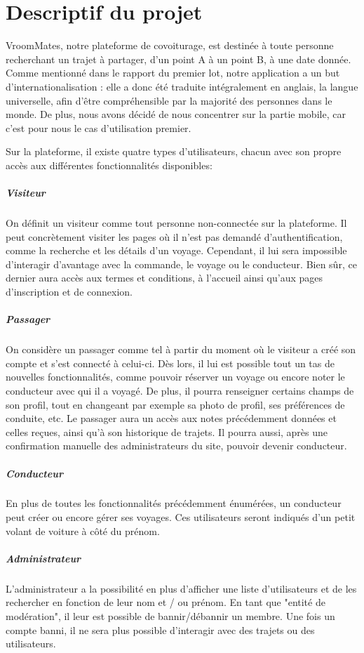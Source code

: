 \section{Descriptif du projet}

VroomMates, notre plateforme de covoiturage, est destinée à toute personne recherchant un trajet à partager, d'un point A à un point B, à une date donnée. Comme mentionné dans le rapport du premier lot, notre application a un but d'internationalisation : elle a donc été traduite intégralement en anglais, la langue universelle, afin d'être compréhensible par la majorité des personnes dans le monde. De plus, nous avons décidé de nous concentrer sur la partie mobile, car c'est pour nous le cas d'utilisation premier.

Sur la plateforme, il existe quatre types d'utilisateurs, chacun avec son propre accès aux différentes fonctionnalités disponibles:

\subparagraph{Visiteur}

On définit un visiteur comme tout personne non-connectée sur la plateforme. Il peut concrètement visiter les pages où il n'est pas demandé d'authentification, comme la recherche et les détails d'un voyage. Cependant, il lui sera impossible d'interagir d'avantage avec la commande, le voyage ou le conducteur.
Bien sûr, ce dernier aura accès aux termes et conditions, à l'accueil ainsi qu'aux pages d'inscription et de connexion.

\subparagraph{Passager}

On considère un passager comme tel à partir du moment où le visiteur a créé son compte et s'est connecté à celui-ci. Dès lors, il lui est possible tout un tas de nouvelles fonctionnalités, comme pouvoir réserver un voyage ou encore noter le conducteur avec qui il a voyagé. De plus, il pourra renseigner certains champs de son profil, tout en changeant par exemple sa photo de profil, ses préférences de conduite, etc. Le passager aura un accès aux notes précédemment données et celles reçues, ainsi qu'à son historique de trajets. Il pourra aussi, après une confirmation manuelle des administrateurs du site, pouvoir devenir conducteur. 

\subparagraph{Conducteur}

En plus de toutes les fonctionnalités précédemment énumérées, un conducteur peut créer ou encore gérer ses voyages. Ces utilisateurs seront indiqués d'un petit volant de voiture à côté du prénom.

\subparagraph{Administrateur}

L'administrateur a la possibilité en plus d'afficher une liste d'utilisateurs et de les rechercher en fonction de leur nom et / ou prénom. En tant que "entité de modération", il leur est possible de bannir/débannir un membre. Une fois un compte banni, il ne sera plus possible d'interagir avec des trajets ou des utilisateurs.
